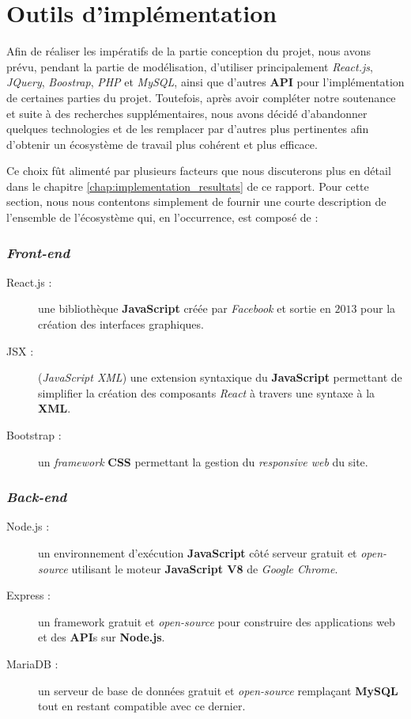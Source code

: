 \documentclass[a4paper,12pt]{report}
\theoremstyle{break}
\theoremstyle{break}
\theoremstyle{break}
\theoremstyle{break}
\theoremstyle{definition}
\theoremstyle{remark}
\begin{document}
\section{Outils d'implémentation}
Afin de réaliser les impératifs de la partie conception du projet, nous avons prévu, pendant la partie de modélisation, d'utiliser principalement \textit{React.js}, \textit{JQuery}, \textit{Boostrap}, \textit{PHP} et \textit{MySQL}, ainsi que d'autres \textbf{API} pour l'implémentation de certaines parties du projet. Toutefois, après avoir compléter notre soutenance et suite à des recherches supplémentaires, nous avons décidé d'abandonner quelques technologies et de les remplacer par d'autres plus pertinentes afin d'obtenir un écosystème de travail plus cohérent et plus efficace.

Ce choix fût alimenté par plusieurs facteurs que nous discuterons plus en détail dans le chapitre \ref{chap:implementation_resultats} de ce rapport. Pour cette section, nous nous contentons simplement de fournir une courte description de l'ensemble de l'écosystème qui, en l'occurrence, est composé de :

\subsubsection{\textit{Front-end}}
\begin{description}
  \item [React.js :] une bibliothèque \textbf{JavaScript} créée par \textit{Facebook} et sortie en $2013$ pour la création des interfaces graphiques.
  \item [JSX :] (\textit{JavaScript XML}) une extension syntaxique du \textbf{JavaScript} permettant de simplifier la création des composants \textit{React} à travers une syntaxe à la \textbf{XML}.
  \item [Bootstrap :] un \textit{framework} \textbf{CSS} permettant la gestion du \textit{responsive web} du site.
\end{description}

\subsubsection{\textit{Back-end}}
\begin{description}
  \item [Node.js :] un environnement d'exécution \textbf{JavaScript} côté serveur gratuit et \textit{open-source} utilisant le moteur \textbf{JavaScript V8} de \textit{Google Chrome}.
  \item [Express :] un framework gratuit et \textit{open-source} pour construire des applications web et des \textbf{API}s sur \textbf{Node.js}.
  \item [MariaDB :] un serveur de base de données gratuit et \textit{open-source} remplaçant \textbf{MySQL} tout en restant compatible avec ce dernier.
\end{description}
\end{document}
